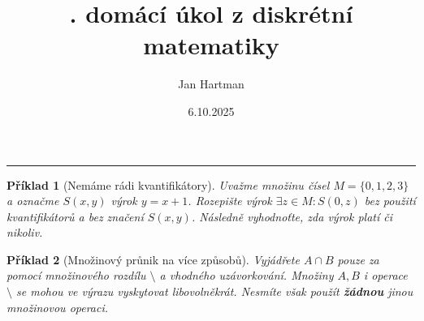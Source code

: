 \documentclass[11pt]{article}
\title{\tutnum. domácí úkol z diskrétní matematiky}
\author{Jan Hartman}
\date{6.10.2025}
\newcommand{\titlerule}{%
    \noindent %
    \makebox[\textwidth]{\large \thetitle \hfill termín: \thedate}
    \rule{\textwidth}{0.4pt}%
}
\theoremstyle{definitionstyle}
\theoremstyle{problemstyle}
\newtheorem{problem}{Příklad}
\begin{document}
\titlerule

\begin{problem}[Nemáme rádi kvantifikátory]
Uvažme množinu čísel $M = \{ 0,1,2,3 \}$ a označme $S(x,y)$ výrok $y = x + 1$. Rozepište výrok $\exists z \in M : S(0,z)$ bez použití kvantifikátorů a bez značení $S(x,y)$. Následně vyhodnoťte, zda výrok platí či nikoliv.
\end{problem}

\begin{problem}[Množinový průnik na více způsobů]
Vyjádřete $A \cap B$ pouze za pomocí množinového rozdílu $\setminus$ a vhodného uzávorkování. Množiny $A,B$ i operace $\setminus$ se mohou ve výrazu vyskytovat libovolněkrát. Nesmíte však použít \textbf{žádnou} jinou množinovou operaci.
\end{problem}
\end{document}

